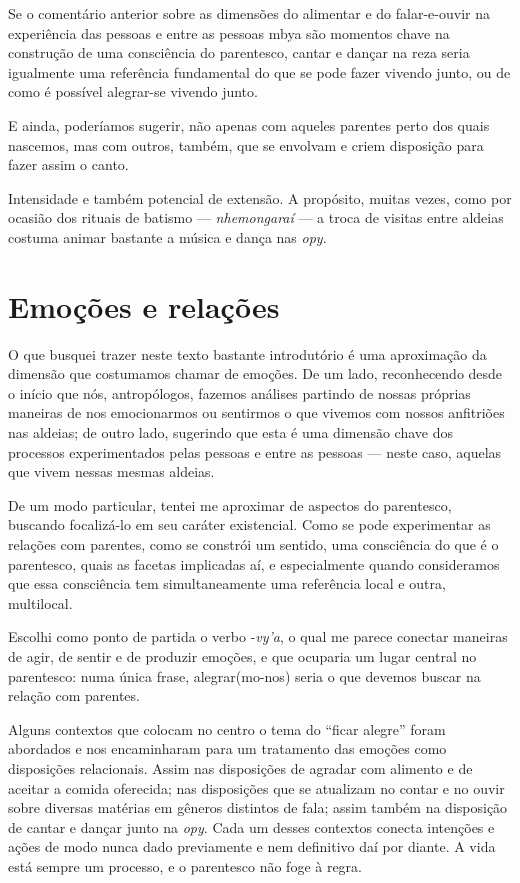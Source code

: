 Se o comentário anterior sobre as dimensões do alimentar e do
falar-e-ouvir na experiência das pessoas e entre as pessoas mbya são
momentos chave na construção de uma consciência do parentesco, cantar e
dançar na reza seria igualmente uma referência fundamental do que se
pode fazer vivendo junto, ou de como é possível alegrar-se vivendo
junto.

E ainda, poderíamos sugerir, não apenas com aqueles parentes perto dos
quais nascemos, mas com outros, também, que se envolvam e criem
disposição para fazer assim o canto.

Intensidade e também potencial de extensão. A propósito, muitas vezes,
como por ocasião dos rituais de batismo --- \emph{nhemongaraí} --- a troca de
visitas entre aldeias costuma animar bastante a música e dança nas \emph{opy}.

\section{Emoções e relações}

O que busquei trazer neste texto bastante introdutório é uma aproximação
da dimensão que costumamos chamar de emoções. De um lado, reconhecendo
desde o início que nós, antropólogos, fazemos análises partindo de
nossas próprias maneiras de nos emocionarmos ou sentirmos o que vivemos
com nossos anfitriões nas aldeias; de outro lado, sugerindo que esta é
uma dimensão chave dos processos experimentados pelas pessoas e entre
as pessoas --- neste caso, aquelas que vivem nessas mesmas aldeias.

De um modo particular, tentei me aproximar de aspectos do parentesco,
buscando focalizá-lo em seu caráter existencial. Como se pode
experimentar as relações com parentes, como se constrói um sentido, uma
consciência do que é o parentesco, quais as facetas implicadas aí, e
especialmente quando consideramos que essa consciência tem
simultaneamente uma referência local e outra, multilocal.

Escolhi como ponto de partida o verbo -\emph{vy’a}, o qual me parece conectar
maneiras de agir, de sentir e de produzir emoções, e que ocuparia um
lugar central no parentesco: numa única frase, alegrar(mo-nos) seria o
que devemos buscar na relação com parentes. 

Alguns contextos que colocam no centro o tema do ``ficar alegre'' foram
abordados e nos encaminharam para um tratamento das emoções como
disposições relacionais. Assim nas disposições de agradar com alimento
e de aceitar a comida oferecida; nas disposições que se atualizam no
contar e no ouvir sobre diversas matérias em gêneros distintos de fala;
assim também na disposição de cantar e dançar junto na \emph{opy}. Cada um
desses contextos conecta intenções e ações de modo nunca dado
previamente e nem definitivo daí por diante. A vida está sempre um
processo, e o parentesco não foge à regra.

